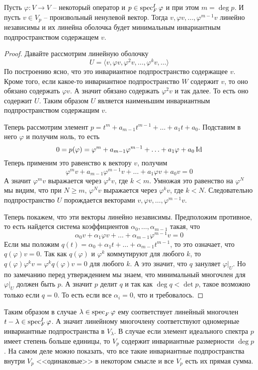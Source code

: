 \begin{claim}
Пусть $\varphi\colon V\to V$ -- некоторый оператор и $p\in \operatorname{spec}^I_F\varphi$ и при этом $m = \deg p$.
И пусть $v\in V_p$ -- произвольный ненулевой вектор.
Тогда $v,\varphi v,\ldots, \varphi^{m-1}v$ линейно независимы и их линейна оболочка будет минимальным инвариантным подпространством содержащем $v$.
\end{claim}
\begin{proof}
Давайте рассмотрим линейную оболочку
\[
U = \langle v, \varphi v, \varphi^2 v, \ldots, \varphi^k v, \ldots\rangle
\]
По построению ясно, что это инвариантное подпространство содержащее $v$.
Кроме того, если какое-то инвариантное подпространство $W$ содержит $v$, то оно обязано содержать $\varphi v$.
А значит обязано содержать $\varphi^2 v$ и так далее.
То есть оно содержит $U$.
Таким образом $U$ является наименьшим инвариантным подпространством содержащим $v$.

Теперь рассмотрим элемент $p = t^m + a_{m-1}t^{m-1} + \ldots + a_1 t + a_0$.
Подставим в него $\varphi$ и получим ноль, то есть
\[
0 = p(\varphi) = \varphi^m + a_{m-1} \varphi^{m-1} + \ldots + a_1 \varphi + a_0 \operatorname{Id}
\]
Теперь применим это равенство к вектору $v$, получим
\[
\varphi^mv + a_{m-1} \varphi^{m-1}v + \ldots + a_1 \varphi v + a_0 v = 0
\]
А значит $\varphi^m v$ выражается через $\varphi^k v$, где $k < m$.
Умножая это равенство на $\varphi^N$ мы видим, что при $N \geqslant m$, $\varphi^N v$ выражается через $\varphi^k v$, где $k < N$.
Следовательно подпространство $U$ порождается векторами $v, \varphi v, \ldots, \varphi^{m-1} v$.

Теперь покажем, что эти векторы линейно независимы.
Предположим противное, то есть найдется система коэффициентов $\alpha_0,\ldots, \alpha_{m-1}$ такая, что
\[
\alpha_0 v + \alpha_1 \varphi v + \ldots + \alpha_{m-1} \varphi^{m-1} v = 0
\]
Если мы положим $q(t) = \alpha_0 + \alpha_1 t + \ldots + \alpha_{m-1} t^{m-1}$, то это означает, что $q(\varphi)v = 0$.
Так как $q(\varphi)$ и $\varphi^k$ коммутируют для любого $k$, то $q(\varphi) \varphi^k v = \varphi^k q(\varphi) v = 0$ для любого $k$.
А это значит, что $q$ зануляет $\varphi|_U$.
Но по замечанию перед утверждением мы знаем, что минимальный многочлен для $\varphi|_U$ должен быть $p$.
А значит $p$ делит $q$ и так как $\deg q < \det p$, такое возможно только если $q = 0$.
То есть если все $\alpha_i = 0$, что и требовалось.
\end{proof}

Таким образом в случае $\lambda \in \operatorname{spec}_F \varphi$ ему соответствует линейный многочлен $t - \lambda \in \operatorname{spec}^I_F\varphi$.
А значит линейному многочлену соответствуют одномерные инвариантные подпространства в $V_\lambda$.
В случае если элемент идеального спектра $p$ имеет степень больше единицы, то $V_p$ содержит инвариантные размерности $\deg p$.
На самом деле можно показать, что все такие инвариантные подпространства внутри $V_p$ <<одинаковые>> в некотором смысле и все $V_p$ есть их прямая сумма.
